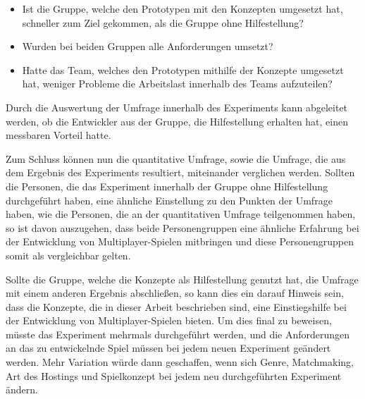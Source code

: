 \begin{itemize}
	\item Ist die Gruppe, welche den Prototypen mit den Konzepten umgesetzt hat, schneller zum Ziel gekommen, als die Gruppe ohne Hilfestellung?
	\item Wurden bei beiden Gruppen alle Anforderungen umsetzt?
	\item Hatte das Team, welches den Prototypen mithilfe der Konzepte umgesetzt hat, weniger Probleme die Arbeitslast innerhalb des Teams aufzuteilen?
\end{itemize}

Durch die Auswertung der Umfrage innerhalb des Experiments kann abgeleitet werden, ob die Entwickler aus der Gruppe, die Hilfestellung erhalten hat, einen messbaren Vorteil hatte.

Zum Schluss können nun die quantitative Umfrage, sowie die Umfrage, die aus dem Ergebnis des Experiments resultiert, miteinander verglichen werden. Sollten die Personen, die das Experiment innerhalb der Gruppe ohne Hilfestellung durchgeführt haben, eine ähnliche Einstellung zu den Punkten der Umfrage haben, wie die Personen, die an der quantitativen Umfrage teilgenommen haben, so ist davon auszugehen, dass beide Personengruppen eine ähnliche Erfahrung bei der Entwicklung von Multiplayer-Spielen mitbringen und diese Personengruppen somit als vergleichbar gelten.

Sollte die Gruppe, welche die Konzepte als Hilfestellung genutzt hat, die Umfrage mit einem anderen Ergebnis abschließen, so kann dies ein darauf Hinweis sein, dass die Konzepte, die in dieser Arbeit beschrieben sind, eine Einstiegshilfe bei der Entwicklung von Multiplayer-Spielen bieten. Um dies final zu beweisen, müsste das Experiment mehrmals durchgeführt werden, und die Anforderungen an das zu entwickelnde Spiel müssen bei jedem neuen Experiment geändert werden. Mehr Variation würde dann geschaffen, wenn sich Genre, Matchmaking, Art des Hostings und Spielkonzept bei jedem neu durchgeführten Experiment ändern.